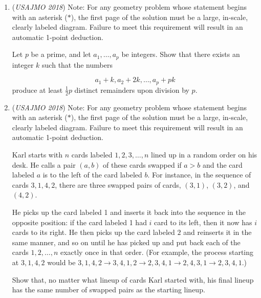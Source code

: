 \begin{enumerate}
 Triangle $ABC$ is inscribed in a circle of radius 2 with $\angle ABC \geq 90^\circ$, and $x$ is a real number satisfying the equation $x^4 + ax^3 + bx^2 + cx + 1 = 0$, where $a=BC,b=CA,c=AB$. Find all possible values of $x$.


 

	\item (\textit{USAJMO 2018}) Note: For any geometry problem whose statement begins with an asterisk ($*$), the first page of the solution must be a large, in-scale, clearly labeled diagram. Failure to meet this requirement will result in an automatic 1-point deduction. 


 Let $p$ be a prime, and let $a_1, \dots, a_p$ be integers. Show that there exists an integer $k$ such that the numbers

 \[a_1 + k, a_2 + 2k, \dots, a_p + pk\]produce at least $\frac{1}{2} p$ distinct remainders upon division by $p$.


 

	\item (\textit{USAJMO 2018}) Note: For any geometry problem whose statement begins with an asterisk ($*$), the first page of the solution must be a large, in-scale, clearly labeled diagram. Failure to meet this requirement will result in an automatic 1-point deduction. 


 Karl starts with $n$ cards labeled $1,2,3,\dots,n$ lined up in a random order on his desk. He calls a pair $(a,b)$ of these cards swapped if $a>b$ and the card labeled $a$ is to the left of the card labeled $b$. For instance, in the sequence of cards $3,1,4,2$, there are three swapped pairs of cards, $(3,1)$, $(3,2)$, and $(4,2)$.


 He picks up the card labeled 1 and inserts it back into the sequence in the opposite position: if the card labeled 1 had $i$ card to its left, then it now has $i$ cards to its right. He then picks up the card labeled $2$ and reinserts it in the same manner, and so on until he has picked up and put back each of the cards $1,2,\dots,n$ exactly once in that order. (For example, the process starting at $3,1,4,2$ would be $3,1,4,2\to 3,4,1,2\to 2,3,4,1\to 2,4,3,1\to 2,3,4,1$.)


 Show that, no matter what lineup of cards Karl started with, his final lineup has the same number of swapped pairs as the starting lineup.


 

\end{enumerate}